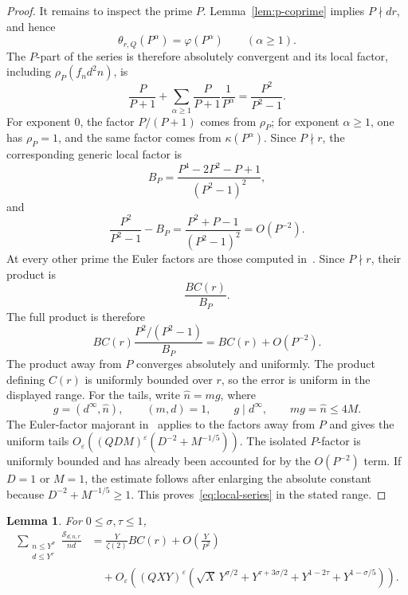 \documentclass[12pt,reqno]{amsart}
\numberwithin{equation}{section}
\theoremstyle{plain}
\newtheorem{lemma}[theorem]{Lemma}
\theoremstyle{definition}
\theoremstyle{remark}
\begin{document}
\begin{proof}
It remains to inspect the prime $P$.  Lemma~\ref{lem:p-coprime} implies $P\nmid d r$, and hence
\[
\theta_{r,Q}(P^\alpha)=\varphi(P^\alpha)
\qquad(\alpha\geq1).
\]
The $P$-part of the series is therefore absolutely convergent and its local factor, including $\rho_P(f_nd^2n)$, is
\[
\frac{P}{P+1}
+
\sum_{\alpha\geq1}
\frac{P}{P+1}\frac1{P^\alpha}
=
\frac{P^2}{P^2-1}.
\]
For exponent $0$, the factor $P/(P+1)$ comes from $\rho_P$; for exponent $\alpha\geq1$, one has $\rho_P=1$, and the same factor comes from $\kappa(P^\alpha)$.
Since $P\nmid r$, the corresponding generic local factor is
\[
B_P=\frac{P^4-2P^2-P+1}{(P^2-1)^2},
\]
and
\[
\frac{P^2}{P^2-1}-B_P
=\frac{P^2+P-1}{(P^2-1)^2}
=O(P^{-2}).
\]
At every other prime the Euler factors are those computed in~\cite[Lemmas~3.8--3.10]{Zubrilina2025}.
Since $P\nmid r$, their product is
\[
\frac{BC(r)}{B_P}.
\]
The full product is therefore
\[
BC(r)\frac{P^2/(P^2-1)}{B_P}=BC(r)+O(P^{-2}).
\]
The product away from $P$ converges absolutely and uniformly.
The product defining $C(r)$ is uniformly bounded over $r$, so the error is uniform in the displayed range.
For the tails, write $\widehat n=mg$, where
\[
g=(d^\infty,\widehat n),
\qquad (m,d)=1,
\qquad g\mid d^\infty,
\qquad mg=\widehat n\leq4M.
\]
The Euler-factor majorant in~\cite[Lemma~3.10]{Zubrilina2025} applies to the factors away from $P$ and gives the uniform tails
$O_\varepsilon((QDM)^\varepsilon(D^{-2}+M^{-1/5}))$.
The isolated $P$-factor is uniformly bounded and has already been accounted for by the $O(P^{-2})$ term.
If $D=1$ or $M=1$, the estimate follows after enlarging the absolute constant because $D^{-2}+M^{-1/5}\geq1$.
This proves~\eqref{eq:local-series} in the stated range.
\end{proof}

\begin{lemma}\label{lem:small-n}
For $0\leq\sigma,\tau\leq1$,
\begin{equation*}
\begin{aligned}
\sum_{\substack{n\leq Y^\sigma\\d\leq Y^\tau}}
\frac{\mathcal S_{d,n,r}}{nd}
&=
\frac{Y}{\zeta(2)}BC(r)
+O\left(\frac{Y}{P^2}\right)\\
&\quad+
O_\varepsilon\left(
(QXY)^\varepsilon
\left(
\sqrt X\,Y^{\sigma/2}
+Y^{\tau+3\sigma/2}
+Y^{1-2\tau}
+Y^{1-\sigma/5}
\right)
\right).
\end{aligned}
\end{equation*}
\end{lemma}
\end{document}
